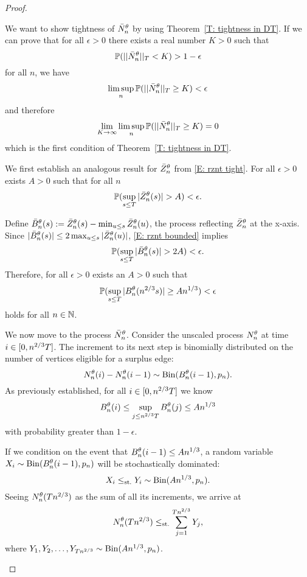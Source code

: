 \begin{proof}
\begin{proofpart}
We want to show tightness of $\bar{N}_n^{\theta}$ by using Theorem~\ref{T: tightness in DT}.
If we can prove that for all $\epsilon > 0$ there exists a real number $K > 0$ such that
\begin{equation}
	\mathbb{P}(||\bar{N}_n^{\theta}||_T < K) > 1 - \epsilon
\end{equation}
for all $n$, we have
\begin{equation}
	\limsup_n \mathbb{P}(||\bar{N}_n^{\theta}||_T \geq K) < \epsilon
\end{equation}
and therefore
\begin{equation}
	\lim_{K \rightarrow \infty} \limsup_n \mathbb{P}(||\bar{N}_n^{\theta}||_T \geq K) = 0
\end{equation}
which is the first condition of Theorem~\ref{T: tightness in DT}.

We first establish an analogous result for $\bar{Z}^{\theta}_n$ from \eqref{E: rznt tight}.
For all $\epsilon > 0$ exists $A>0$ such that for all $n$
\begin{equation} \label{E: rznt bounded}
\mathbb{P}(\sup_{s \leq T} |\bar{Z}^{\theta}_n(s)| > A) < \epsilon.
\end{equation}

Define $\bar{B}_n^{\theta}(s) := \bar{Z}^{\theta}_n(s) - \min_{u \leq s}\bar{Z}^{\theta}_n(u)$, the process reflecting $\bar{Z}^{\theta}_n$ at the x-axis.
Since $|\bar{B}_n^{\theta}(s)| \leq 2\max_{u \leq s}|\bar{Z}^{\theta}_n(u)|$, \eqref{E: rznt bounded} implies
\begin{equation} \label{E: rzminz bounded}
\mathbb{P}(\sup_{s \leq T} |\bar{B}_n^{\theta}(s)| > 2A) < \epsilon.
\end{equation}
Therefore, for all $\epsilon > 0$ exists an $A>0$ such that
\begin{equation}
\mathbb{P}( \sup_{s \leq T} |B_n^{\theta}(n^{2 / 3}s)| \geq An^{1 / 3} ) < \epsilon
\end{equation}
holds for all $n \in \mathbb{N}$.

We now move to the process $\bar{N}_n^{\theta}$. Consider the unscaled process $N_n^{\theta}$ at time $i \in [0, n^{2 / 3}T]$.
The increment to its next step is binomially distributed on the number of vertices eligible for a surplus edge:
\begin{equation}
N_n^{\theta}(i) - N_n^{\theta}(i-1) \sim \operatorname*{Bin}(B_n^{\theta}(i-1), p_n).
\end{equation}
As previously established, for all $i \in [0, n^{2 / 3}T]$ we know 
\begin{equation}
	B_n^{\theta}(i) \leq \sup_{j \leq n^{2 / 3}T} B_n^{\theta}(j) \leq An^{1 / 3}
\end{equation}
with probability greater than $1-\epsilon$.

If we condition on the event that $B_n^{\theta}(i-1) \leq An^{1 / 3}$, a random variable $X_i \sim \operatorname*{Bin}(B_n^{\theta}(i-1), p_n)$ will be stochastically dominated:
\begin{equation}
X_i \leq_{\text{st.}} Y_i \sim \operatorname*{Bin}(An^{1 / 3}, p_n).
\end{equation}
Seeing $N_n^{\theta}(Tn^{2 / 3})$ as the sum of all its increments, we arrive at
\begin{equation} \label{E: nnt stoch dominance}
N_n^{\theta}(Tn^{2 / 3}) \leq_{\text{st.}} \sum_{j=1}^{Tn^{2 / 3}} Y_j,
\end{equation}
where $Y_1, Y_2, \dots, Y_{Tn^{2 / 3}} \sim \operatorname*{Bin}(An^{1 / 3}, p_n)$.


\end{proofpart}
\end{proof}
